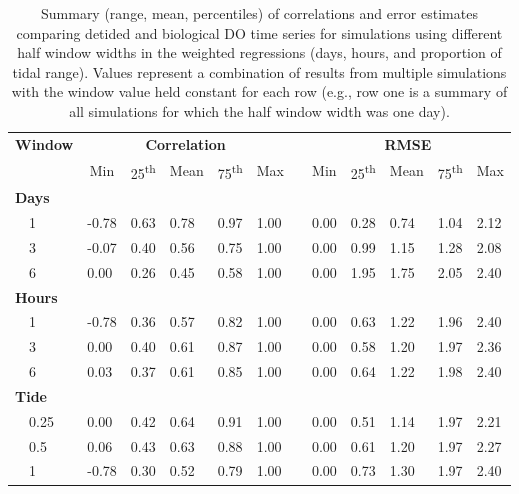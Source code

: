 \documentclass[letterpaper,12pt,oneside]{article}\usepackage[]{graphicx}\usepackage[]{color}
\begin{document}
%
\begin{table}[!tbp]
\caption{Summary (range, mean, percentiles) of correlations and error estimates comparing detided and biological \ac{DO} time series for simulations using different half window widths in the weighted regressions (days, hours, and proportion of tidal range).  Values represent a combination of results from multiple simulations with the window value held constant for each row (e.g., row one is a summary of all simulations for which the half window width was one day).\label{tab:dtd_perf2}} 
\begin{center}
\begin{tabular}{llllllclllll}
\hline\hline
\multicolumn{1}{l}{\bfseries Window}&\multicolumn{5}{c}{\bfseries Correlation}&\multicolumn{1}{c}{\bfseries }&\multicolumn{5}{c}{\bfseries RMSE}\tabularnewline
\cline{2-6} \cline{8-12}
\multicolumn{1}{l}{}&\multicolumn{1}{c}{Min}&\multicolumn{1}{c}{25\textsuperscript{th}}&\multicolumn{1}{c}{Mean}&\multicolumn{1}{c}{75\textsuperscript{th}}&\multicolumn{1}{c}{Max}&\multicolumn{1}{c}{}&\multicolumn{1}{c}{Min}&\multicolumn{1}{c}{25\textsuperscript{th}}&\multicolumn{1}{c}{Mean}&\multicolumn{1}{c}{75\textsuperscript{th}}&\multicolumn{1}{c}{Max}\tabularnewline
\hline
{\bfseries Days}&&&&&&&&&&&\tabularnewline
~~1&-0.78&0.63&0.78&0.97&1.00&&0.00&0.28&0.74&1.04&2.12\tabularnewline
~~3&-0.07&0.40&0.56&0.75&1.00&&0.00&0.99&1.15&1.28&2.08\tabularnewline
~~6& 0.00&0.26&0.45&0.58&1.00&&0.00&1.95&1.75&2.05&2.40\tabularnewline
\hline
{\bfseries Hours}&&&&&&&&&&&\tabularnewline
~~1&-0.78&0.36&0.57&0.82&1.00&&0.00&0.63&1.22&1.96&2.40\tabularnewline
~~3& 0.00&0.40&0.61&0.87&1.00&&0.00&0.58&1.20&1.97&2.36\tabularnewline
~~6& 0.03&0.37&0.61&0.85&1.00&&0.00&0.64&1.22&1.98&2.40\tabularnewline
\hline
{\bfseries Tide}&&&&&&&&&&&\tabularnewline
~~0.25& 0.00&0.42&0.64&0.91&1.00&&0.00&0.51&1.14&1.97&2.21\tabularnewline
~~0.5& 0.06&0.43&0.63&0.88&1.00&&0.00&0.61&1.20&1.97&2.27\tabularnewline
~~1&-0.78&0.30&0.52&0.79&1.00&&0.00&0.73&1.30&1.97&2.40\tabularnewline
\hline
\end{tabular}
\end{center}
\end{table}
\end{document}
